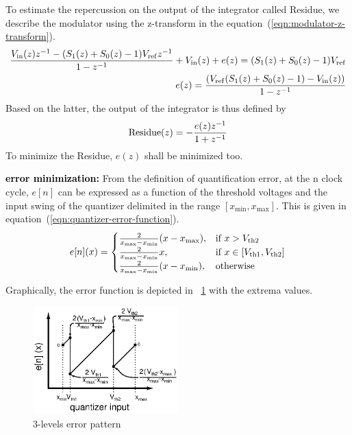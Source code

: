 To estimate the repercussion on the output of the integrator called Residue, we describe the modulator using the z-transform in the equation~(\ref{eqn:modulator-z-transform}).
\begin{eqnarray}
	\label{eqn:modulator-z-transform}
\frac{V_{\rm in}(z)z^{-1}-(S_1(z)+S_0(z)-1)V_{\rm ref}z^{-1}}{1-z^{-1}} + V_{\rm in}(z) + e(z) = (S_1(z)+S_0(z)-1)V_{\rm ref}  \\
e(z) = \frac{(V_{\rm ref}(S_1(z)+S_0(z)-1)-V_{\rm in}(z))}{1-z^{-1}}
\end{eqnarray}
Based on the latter, the output of the integrator is thus defined by 
\begin{equation}
	{\rm Residue}(z) = -\frac{e(z)z^{-1}}{1+z^{-1}}
\end{equation}
To minimize the Residue, \(e(z) \) shall be minimized too. 

\textbf{\textcolor{black}{error minimization:}}
From the definition of quantification error, at the n clock cycle, \(e[n]\) can be expressed as a function of the threshold voltages and the input swing of the quantizer delimited in the range $[x_{\min}, x_{\max}]$. This is given in equation~(\ref{eqn:quantizer-error-function}).
\begin{equation}
	\label{eqn:quantizer-error-function}
	e[n](x) = 
\begin{cases}
	\frac{2}{x_{\max}-x_{\min}}(x-x_{\max}),& \text{if } x > V_{\rm th2} \\
	\frac{2}{x_{\max}-x_{\min}}x  ,& \text{if } x \in [V_{\rm th1}, V_{\rm th2}] \\
	\frac{2}{x_{\max}-x_{\min}}(x-x_{\min}),& \text{otherwise}
\end{cases}
\end{equation}

Graphically, the error function is depicted in \figurename~\ref{fig:3-levels-error-pattern} with the extrema values.
\begin{figure}[htp]
	\centering
	\includegraphics[width=0.5\textwidth]{Chapter4/Figs/3-levels-pattern.ps}
	\caption{3-levels error pattern}
	\label{fig:3-levels-error-pattern}
\end{figure}

